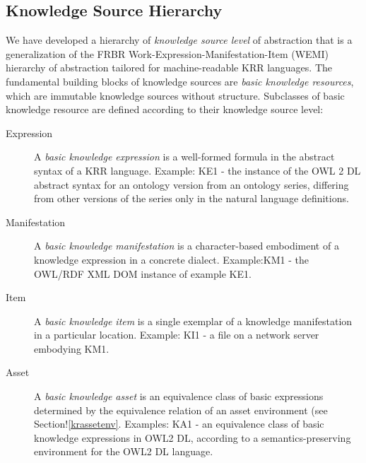 \documentclass[runningheads]{llncs}
\begin{document}

\subsection{Knowledge Source Hierarchy}
We have developed a hierarchy of \emph{knowledge source level} of abstraction that is a generalization of the FRBR \cite{FRBR} Work-Expression-Manifestation-Item (WEMI) hierarchy of abstraction tailored for machine-readable KRR languages. The fundamental building blocks of knowledge sources are \emph{basic knowledge resources}, which are immutable knowledge sources without structure.
Subclasses of basic knowledge resource are defined according to their knowledge source level:
\begin{description}
\item[Expression] A \emph{basic knowledge expression} is a well-formed formula in the abstract syntax of a KRR language.
Example: KE1 - the instance of the OWL 2 DL abstract syntax for an ontology version from an ontology series, differing from other versions of the series only in the natural language definitions.
\item[Manifestation] A \emph{basic knowledge manifestation} is a character-based embodiment of a knowledge expression in a concrete dialect. Example:KM1 - the OWL/RDF XML DOM instance of example KE1.
\item[Item] A \emph{basic knowledge item} is a single exemplar of a knowledge manifestation in a particular location. Example: KI1 - a file on a network server embodying KM1.
\item[Asset] A \emph{basic knowledge asset} is an equivalence class of basic expressions determined by the equivalence relation of an asset environment (see Section!\ref{krassetenv}. Examples: KA1 - an equivalence class of basic knowledge expressions in OWL2 DL, according to a semantics-preserving environment for the OWL2 DL language.
\end{description}
\end{document}
